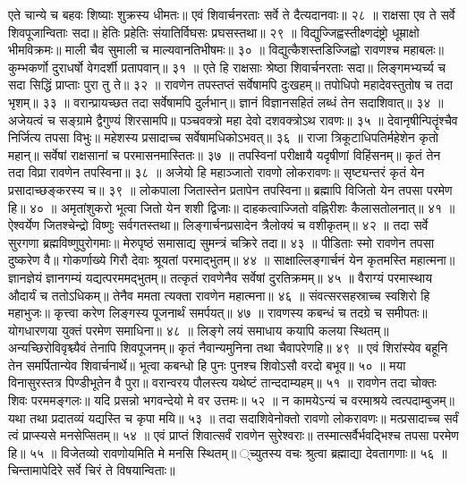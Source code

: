 एते चान्ये च बहवः शिष्याः शुक्रस्य धीमतः॥
एवं शिवार्चनरताः सर्वे ते दैत्यदानवाः॥ २८ ॥
राक्षसा एव ते सर्वे शिवपूजान्विताः सदा॥
हेतिः प्रहेतिः संयातिर्विघसः प्रघसस्तथा॥ २९ ॥
विद्युज्जिह्वस्तीक्ष्णदंष्ट्रो धूम्राक्षो भीमविक्रमः॥
माली चैव सुमाली च माल्यवानतिभीषमः॥ ३० ॥
विद्युत्कैशस्तडिज्जिह्वो रावणश्च महाबलः॥
कुम्भकर्णो दुराधर्षो वेगदर्शी प्रतापवान्॥ ३१ ॥
एते हि राक्षसाः श्रेष्ठा शिवार्चनरताः सदा॥
लिङ्गमभ्यर्च्य च सदा सिद्धिं प्राप्ताः पुरा तु ते॥ ३२ ॥
रावणेन तपस्तप्तं सर्वेषामपि दुःखहम्॥
तपोधिपो महादेवस्तुतोष च तदा भृशम्॥ ३३ ॥
वरान्प्रायच्छत तदा सर्वेषामपि दुर्लभान्॥
ज्ञानं विज्ञानसहितं लब्धं तेन सदाशिवात्॥ ३४ ॥
अजेयत्वं च सङ्ग्रामे द्वैगुण्यं शिरसामपि॥
पञ्चवक्त्रो महा देवो दशवक्त्रोऽथ रावणः॥ ३५ ॥
देवानृषीन्पितॄंश्चैव निर्जित्य तपसा विभुः॥
महेशस्य प्रसादाच्च सर्वेषामधिकोऽभवत्॥ ३६ ॥
राजा त्रिकूटाधिपतिर्महेशेन कृतो महान्॥
सर्वेषां राक्षसानां च परमासनमास्तितः॥ ३७ ॥
तपस्विनां परीक्षायै यदृषीणां विहिंसनम्॥
कृतं तेन तदा विप्रा रावणेन तपस्विना॥ ३८ ॥
अजेयो हि महाञ्जातो रावणो लोकरावणः॥
सृष्ट्यन्तरं कृतं येन प्रसादाच्छङ्करस्य च॥ ३९ ॥
लोकपाला जितास्तेन प्रतापेन तपस्विना॥
ब्रह्मापि विजितो येन तपसा परमेण हि॥ ४० ॥
अमृतांशुकरो भूत्वा जितो येन शशी द्विजाः॥
दाहकत्वाज्जितो वह्निरीशः कैलासतोलनात्॥ ४१ ॥
ऐश्वर्येण जितश्चेन्द्रो विष्णुः सर्वगतस्तथा॥
लिङ्गार्चनप्रसादेन त्रैलोक्यं च वशीकृतम्॥ ४२ ॥
तदा सर्वे सुरगणा ब्रह्मविष्णुपुरोगमाः॥
मेरुपृष्ठं समासाद्य सुमन्त्रं चक्रिरे तदा॥ ४३ ॥
पीडिताः स्मो रावणेन तपसा दुष्करेण वै॥
गोकर्णाख्ये गिरौ देवाः श्रूयतां परमाद्भुतम्॥ ४४ ॥
साक्षाल्लिङ्गार्चनं येन कृतमस्ति महात्मना॥
ज्ञानज्ञेयं ज्ञानगम्यं यद्यत्परममद्भुतम्॥
तत्कृतं रावणेनैव सर्वेषां दुरतिक्रमम्॥ ४५ ॥
वैराग्यं परमास्थाय औदार्यं च ततोऽधिकम्॥
तेनैव ममता त्यक्ता रावणेन महात्मना॥ ४६ ॥
संवत्सरसहस्राच्च स्वशिरो हि महाभुजः॥
कृत्त्वा करेण लिङ्गस्य पूजनार्थं समर्पयत्॥ ४७ ॥
रावणस्य कबन्धं च तदग्रे च समीपतः॥
योगधारणया युक्तं परमेण समाधिना॥ ४८ ॥
लिङ्गे लयं समाधाय कयापि कलया स्थितम्॥
अन्यच्छिरोविवृश्च्यैवं तेनापि शिवपूजनम्॥
कृतं नैवान्यमुनिना तथा चैवापरेणहि॥ ४९ ॥
एवं शिरांस्येव बहूनि तेन समर्पितान्येव शिवार्चनार्थे॥
भूत्वा कबन्धो हि पुनः पुनश्च शिवोऽसौ वरदो बभूव॥ ५० ॥
मया विनासुरस्तत्र पिण्डीभूतेन वै पुरा॥
वरान्वरय पौलस्त्य यथेष्टं तान्ददाम्यहम्॥ ५१ ॥
रावणेन तदा चोक्तः शिवः परममङ्गलः॥
यदि प्रसन्नो भगवन्देयो मे वर उत्तमः॥ ५२ ॥
न कामयेऽन्यं च वरमाश्रये त्वत्पदाम्बुजम्॥
यथा तथा प्रदातव्यं यद्यस्ति च कृपा मयि॥ ५३ ॥
तदा सदाशिवेनोक्तो रावणो लोकरावणः॥
मत्प्रसादाच्च सर्वं त्वं प्राप्स्यसे मनसेप्सितम्॥ ५४ ॥
एवं प्राप्तं शिवात्सर्वं रावणेन सुरेश्वराः॥
तस्मात्सर्वैर्भवद्भिश्च तपसा परमेण हि॥ ५५ ॥
विजेतव्यो रावणोयमिति मे मनसि स्थितम्॥
्च्युतस्य वचः श्रुत्वा ब्रह्माद्या देवतागणाः॥ ५६ ॥
चिन्तामापेदिरे सर्वे चिरं ते विषयान्विताः॥

